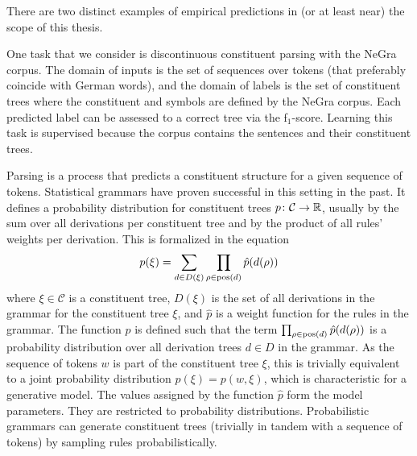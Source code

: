 \documentclass[../document.tex]{subfiles}
\begin{document}
    There are two distinct examples of empirical predictions in (or at least near) the scope of this thesis.

    \begin{example}
        One task that we consider is discontinuous constituent parsing with the NeGra corpus.
        The domain of inputs is the set of sequences over tokens (that preferably coincide with German words), and the domain of labels is the set of constituent trees where the constituent and  symbols are defined by the NeGra corpus.
        Each predicted label can be assessed to a correct tree via the f$_1$-score.
        Learning this task is supervised because the corpus contains the sentences and their constituent trees.

        Parsing is a process that predicts a constituent structure for a given sequence of tokens.
        Statistical grammars have proven successful in this setting in the past.\cite{}
        It defines a probability distribution for constituent trees \(p\colon \mathcal{C} \to \mathbb{R}\), usually by the sum over all derivations per constituent tree and by the product of all rules' weights per derivation.
        This is formalized in the equation \[
        p(\xi) = \sum_{d \in D(\xi)} \prod_{\rho \in \operatorname{pos}(d)} \hat{p}(d(\rho))
        \]
        where \(\xi \in \mathcal{C}\) is a constituent tree, \(D(\xi)\) is the set of all derivations in the grammar for the constituent tree \(\xi\), and \(\hat{p}\) is a weight function for the rules in the grammar.
        The function \(\hat{p}\) is defined such that the term \(\prod_{\rho \in \operatorname{pos}(d)} \hat{p}(d(\rho))\) is a probability distribution over all derivation trees \(d \in D\) in the grammar.
        As the sequence of tokens \(w\) is part of the constituent tree \(\xi\), this is trivially equivalent to a joint probability distribution \(p(\xi) = p(w, \xi)\), which is characteristic for a generative model.
        The values assigned by the function \(\hat{p}\) form the model parameters. They are restricted to probability distributions.
        Probabilistic grammars can generate constituent trees (trivially in tandem with a sequence of tokens) by sampling rules probabilistically.
    \end{example}
\end{document}
